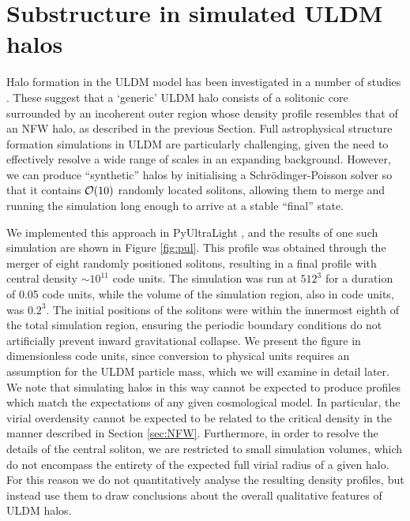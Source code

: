 \documentclass[a4paper,11pt]{article}
\begin{document}
\section{Substructure in simulated ULDM halos}\label{sec:sim_comparison}

Halo formation in the ULDM model has been investigated in a number of studies \cite{Schwabe:2016rze, Mocz:2017wlg, Lin:2018whl}. These suggest that a `generic' ULDM halo consists of a solitonic core surrounded by an incoherent outer region whose density profile resembles that of an NFW halo, as described in the previous Section. Full astrophysical structure formation simulations in ULDM are particularly challenging, given the need to effectively resolve a wide range of scales in an expanding background. However, we can produce ``synthetic'' halos by initialising a Schr{\"o}dinger-Poisson solver so that it contains ${\cal{O}}(10)$ randomly located solitons, allowing them to merge and running the simulation long enough to arrive at a stable ``final'' state. 

We implemented this approach in {\sc PyUltraLight} \cite{Edwards:2018ccc}, and the results of one such simulation are shown in Figure \ref{fig:pul}. This profile was obtained through the merger of eight randomly positioned solitons, resulting in a final profile with central density $\sim 10^{11}$ code units.
The simulation was run at $512^3$ for a duration of 0.05 code units, while the volume of the simulation region, also in code units, was $0.2^3$. The initial positions of the solitons were within the innermost eighth of the total simulation region, ensuring the periodic boundary conditions do not artificially prevent inward gravitational collapse. We present the figure in dimensionless code units, since conversion to physical units requires an assumption for the ULDM particle mass, which we will examine in detail later. We note that simulating halos in this way cannot be expected to produce profiles which match the expectations of any given cosmological model. In particular, the virial overdensity cannot be expected to be related to the critical density in the manner described in Section \ref{sec:NFW}. Furthermore, in order to resolve the details of the central soliton, we are restricted to small simulation volumes, which do not encompass the entirety of the expected full virial radius of a given halo. For this reason we do not quantitatively analyse the resulting density profiles, but instead use them to draw conclusions about the overall qualitative features of ULDM halos.
\end{document}

